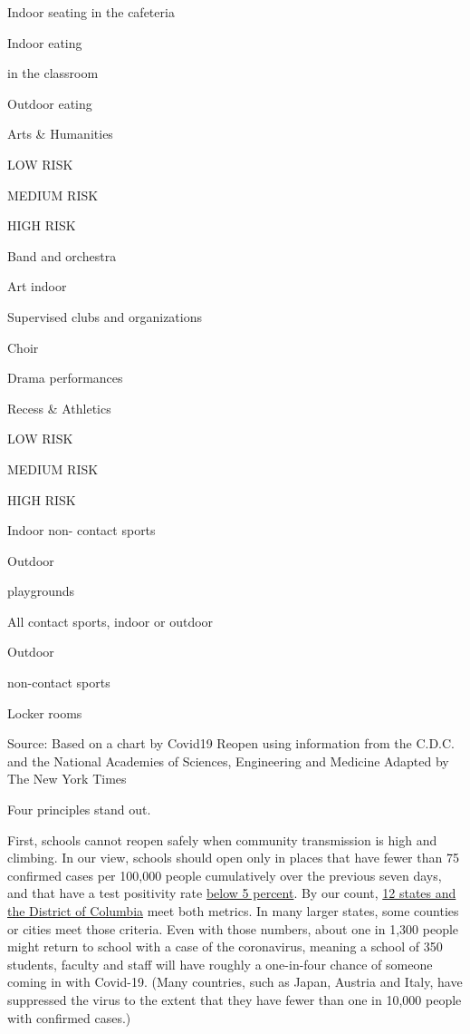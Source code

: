 Indoor seating in the cafeteria

Indoor eating

in the classroom

Outdoor eating

Arts \& Humanities

LOW RISK

MEDIUM RISK

HIGH RISK

Band and orchestra

Art indoor

Supervised clubs and organizations

Choir

Drama performances

Recess \& Athletics

LOW RISK

MEDIUM RISK

HIGH RISK

Indoor non- contact sports

Outdoor

playgrounds

All contact sports, indoor or outdoor

Outdoor

non-contact sports

Locker rooms

Source: Based on a chart by Covid19 Reopen using information from the
C.D.C. and the National Academies of Sciences, Engineering and Medicine
\textbar{} Adapted by The New York Times

Four principles stand out.

First, schools cannot reopen safely when community transmission is high
and climbing. In our view, schools should open only in places that have
fewer than 75 confirmed cases per 100,000 people cumulatively over the
previous seven days, and that have a test positivity rate
\href{https://coronavirus.jhu.edu/testing/tracker/overview}{below 5
percent}. By our count,
\href{https://www.nytimes.com/interactive/2020/us/coronavirus-us-cases.html\#states}{12
states and the District of Columbia} meet both metrics. In many larger
states, some counties or cities meet those criteria. Even with those
numbers, about one in 1,300 people might return to school with a case of
the coronavirus, meaning a school of 350 students, faculty and staff
will have roughly a one-in-four chance of someone coming in with
Covid-19. (Many countries, such as Japan, Austria and Italy, have
suppressed the virus to the extent that they have fewer than one in
10,000 people with confirmed cases.)

